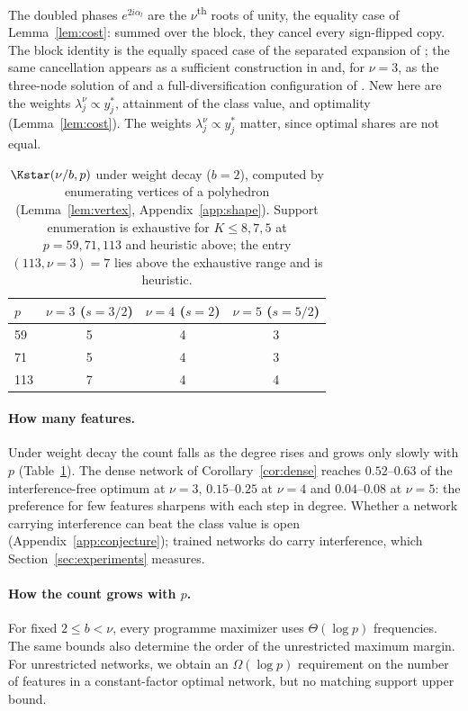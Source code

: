 The doubled phases $e^{2i\alpha_l}$ are the $\nu$\textsuperscript{th} roots of unity, the equality case of Lemma~\ref{lem:cost}: summed over the block, they cancel every sign-flipped copy. The block identity is the equally spaced case of the separated expansion of \citet[Thm.~2]{mohlenkamp2005trig}; the same cancellation appears as a sufficient construction in \citet[Lemma~B.8]{marchetti2026sequential} and, for $\nu=3$, as the three-node solution of \citet{tian2025composing} and a full-diversification configuration of \citet[Sec.~4]{he2026mechanism}. New here are the weights $\lambda_j^\nu\propto y^*_j$, attainment of the class value, and optimality (Lemma~\ref{lem:cost}). The weights $\lambda_j^\nu\propto y^*_j$ matter, since optimal shares are not equal.

\begin{table}[t]
\centering
\caption{$\Kstar(\nu/b,p)$ under weight decay ($b=2$), computed by enumerating vertices of a polyhedron (Lemma~\ref{lem:vertex}, Appendix~\ref{app:shape}). Support enumeration is exhaustive for $K\le8,7,5$ at $p=59,71,113$ and heuristic above; the entry $(113,\nu=3)=7$ lies above the exhaustive range and is heuristic.}
\label{tab:kstar}
\begin{tabular}{lccc}
\toprule
$p$ & $\nu=3$ ($s=3/2$) & $\nu=4$ ($s=2$) & $\nu=5$ ($s=5/2$)\\
\midrule
59 & 5 & 4 & 3\\
71 & 5 & 4 & 3\\
113 & 7 & 4 & 4\\
\bottomrule
\end{tabular}
\end{table}

\paragraph{How many features.} Under weight decay the count falls as the degree rises and grows only slowly with $p$ (Table~\ref{tab:kstar}). The dense network of Corollary~\ref{cor:dense} reaches $0.52$--$0.63$ of the interference-free optimum at $\nu=3$, $0.15$--$0.25$ at $\nu=4$ and $0.04$--$0.08$ at $\nu=5$: the preference for few features sharpens with each step in degree. Whether a network carrying interference can beat the class value is open (Appendix~\ref{app:conjecture}); trained networks do carry interference, which Section~\ref{sec:experiments} measures.

\paragraph{How the count grows with $p$.}
For fixed $2\le b<\nu$, every programme maximizer uses $\Theta(\log p)$ frequencies. The same bounds also determine the order of the unrestricted maximum margin. For unrestricted networks, we obtain an $\Omega(\log p)$ requirement on the number of features in a constant-factor optimal network, but no matching support upper bound.

